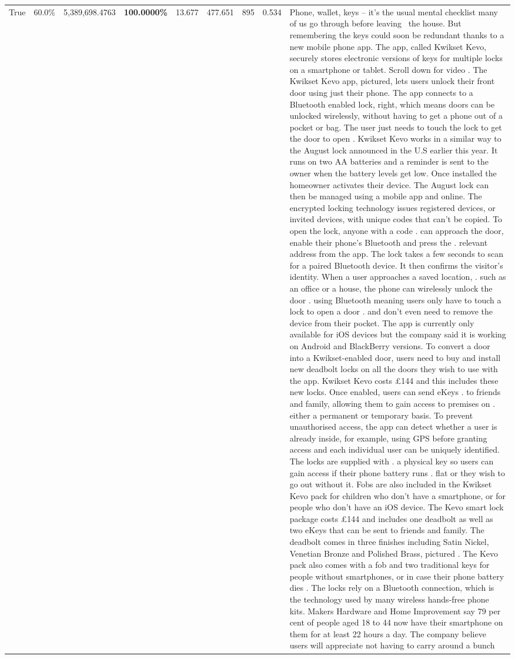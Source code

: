 \begin{table}[H]
\begin{tabular}{lllrlllll}
True & 60.0\% & 5,389,698.4763 & \bfseries \color{red} 100.0000\% & 13.677 & 477.651 & 895 & 0.534 & Phone, wallet, keys – it’s the usual mental checklist many of us go through before leaving  the house. But remembering the keys could soon be redundant thanks to a new mobile phone app. The app, called Kwikset Kevo, securely stores electronic versions of keys for multiple locks on a smartphone or tablet. Scroll down for video . The Kwikset Kevo app, pictured, lets users unlock their front door using just their phone. The app connects to a Bluetooth enabled lock, right, which means doors can be unlocked wirelessly, without having to get a phone out of a pocket or bag. The user just needs to touch the lock to get the door to open . Kwikset Kevo works in a similar way to the August lock announced in the U.S earlier this year. It runs on two AA batteries and a reminder is sent to the owner when the battery levels get low. Once installed the homeowner activates their device. The August lock can then be managed using a mobile app and online. The encrypted locking technology issues registered devices, or invited devices, with unique codes that can't be copied. To open the lock, anyone with a code . can approach the door, enable their phone's Bluetooth and press the . relevant address from the app. The lock takes a few seconds to scan for a paired Bluetooth device. It then confirms the visitor's identity. When a user approaches a saved location, . such as an office or a house, the phone can wirelessly unlock the door . using Bluetooth meaning users only have to touch a lock to open a door . and don't even need to remove the device from their pocket. The app is currently only available for iOS devices but the company said it is working on Android and BlackBerry versions. To convert a door into a Kwikset-enabled door, users need to buy and install new deadbolt locks on all the doors they wish to use with the app. Kwikset Kevo costs £144 and this includes these new locks. Once enabled, users can send eKeys . to friends and family, allowing them to gain access to premises on . either a permanent or temporary basis. To prevent unauthorised access, the app can detect whether a user is already inside, for example, using GPS before granting access and each individual user can be uniquely identified. The locks are supplied with . a physical key so users can gain access if their phone battery runs . flat or they wish to go out without it. Fobs are also included in the Kwikset Kevo pack for children who don't have a smartphone, or for people who don't have an iOS device. The Kevo smart lock package costs £144 and includes one deadbolt as well as two eKeys that can be sent to friends and family. The deadbolt comes in three finishes including Satin Nickel, Venetian Bronze and Polished Brass, pictured . The Kevo pack also comes with a fob and two traditional keys for people without smartphones, or in case their phone battery dies . The locks rely on a Bluetooth connection, which is the technology used by many wireless hands-free phone kits. Makers Hardware and Home Improvement say 79 per cent of people aged 18 to 44 now have their smartphone on them for at least 22 hours a day. The company believe users will appreciate not having to carry around a bunch 
\end{tabular}
\end{table}
